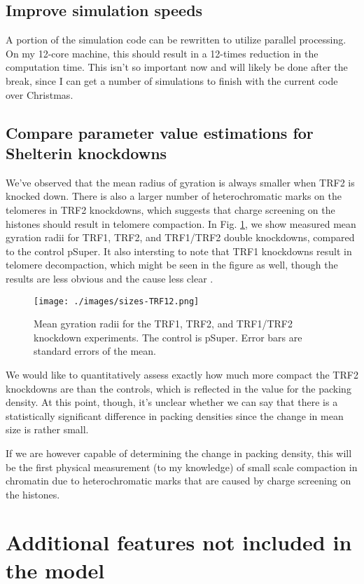 \documentclass[11pt]{article}
\begin{document}
\subsection{Improve simulation speeds}
\label{sec-4-2}
A portion of the simulation code can be rewritten to utilize parallel
processing. On my 12-core machine, this should result in a 12-times
reduction in the computation time. This isn't so important now and
will likely be done after the break, since I can get a number of
simulations to finish with the current code over Christmas.

\subsection{Compare parameter value estimations for Shelterin knockdowns}
\label{sec-4-3}
We've observed that the mean radius of gyration is always smaller when
TRF2 is knocked down. There is also a larger number of heterochromatic
marks on the telomeres in TRF2 knockdowns, which suggests that charge
screening on the histones should result in telomere compaction. In
Fig. \ref{fig-trfKDs}, we show measured mean gyration radii for TRF1,
TRF2, and TRF1/TRF2 double knockdowns, compared to the control
pSuper. It also intersting to note that TRF1 knockdowns result in
telomere decompaction, which might be seen in the figure as well,
though the results are less obvious and the cause less clear
\cite{sfeir-jcellsci-2012}.

\begin{figure}[htb]
\centering
\texttt{[image: ./images/sizes-TRF12.png]}
\caption{\label{fig-trfKDs}Mean gyration radii for the TRF1, TRF2, and TRF1/TRF2 knockdown experiments. The control is pSuper. Error bars are standard errors of the mean.}
\end{figure}

We would like to quantitatively assess exactly how much more compact
the TRF2 knockdowns are than the controls, which is reflected in the
value for the packing density. At this point, though, it's unclear
whether we can say that there is a statistically significant
difference in packing densities since the change in mean size is
rather small.

If we are however capable of determining the change in packing
density, this will be the first physical measurement (to my knowledge)
of small scale compaction in chromatin due to heterochromatic marks
that are caused by charge screening on the histones.

\section{Additional features not included in the model}
\label{sec-5}
\end{document}
